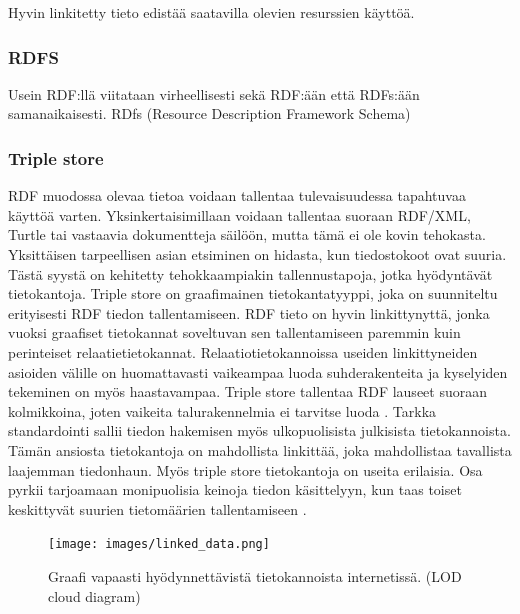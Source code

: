 \documentclass[finnish, 12pt, a4paper, elec, utf8, pdfa, online]{aaltothesis}
\begin{document}
Hyvin linkitetty tieto edistää saatavilla olevien resurssien käyttöä.


\subsubsection{RDFS}
Usein RDF:llä viitataan virheellisesti sekä RDF:ään että RDFs:ään samanaikaisesti. RDfs (Resource Description Framework Schema)


\subsubsection{Triple store} %
RDF muodossa olevaa tietoa voidaan tallentaa tulevaisuudessa tapahtuvaa käyttöä varten. Yksinkertaisimillaan voidaan tallentaa suoraan RDF/XML, Turtle tai vastaavia dokumentteja säilöön, mutta tämä ei ole kovin tehokasta. Yksittäisen tarpeellisen asian etsiminen on hidasta, kun tiedostokoot ovat suuria. Tästä syystä on kehitetty tehokkaampiakin tallennustapoja, jotka hyödyntävät tietokantoja. Triple store on graafimainen tietokantatyyppi, joka on suunniteltu erityisesti RDF tiedon tallentamiseen. RDF tieto on hyvin linkittynyttä, jonka vuoksi graafiset tietokannat soveltuvan sen tallentamiseen paremmin kuin perinteiset relaatietietokannat. Relaatiotietokannoissa useiden linkittyneiden asioiden välille on huomattavasti vaikeampaa luoda suhderakenteita ja kyselyiden tekeminen on myös haastavampaa. Triple store tallentaa RDF lauseet suoraan kolmikkoina, joten vaikeita talurakennelmia ei tarvitse luoda \cite{triplestore}. Tarkka standardointi sallii tiedon hakemisen myös ulkopuolisista julkisista tietokannoista. Tämän ansiosta tietokantoja on mahdollista linkittää, joka mahdollistaa tavallista laajemman tiedonhaun. Myös triple store tietokantoja on useita erilaisia. Osa pyrkii tarjoamaan monipuolisia keinoja tiedon käsittelyyn, kun taas toiset keskittyvät suurien tietomäärien tallentamiseen \cite{revisited}.

\begin{figure}[htb]
\centering
\texttt{[image: images/linked\_data.png]}
\caption{Graafi vapaasti hyödynnettävistä tietokannoista internetissä. (LOD cloud diagram) \cite{LOD_cloud} \label{images/linked_data}}
\end{figure}
\end{document}
